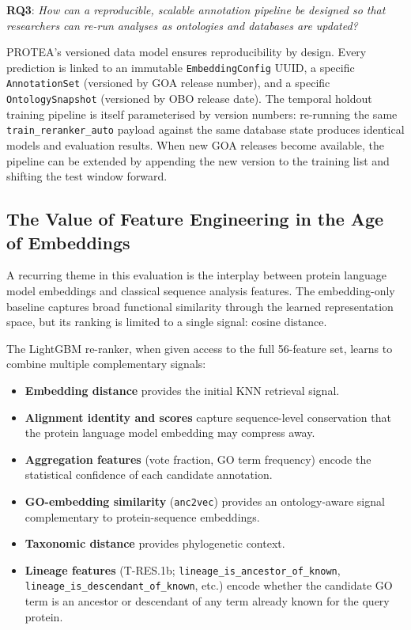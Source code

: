 \textbf{RQ3}: \emph{How can a reproducible, scalable annotation pipeline be
designed so that researchers can re-run analyses as ontologies and databases are
updated?}

PROTEA's versioned data model ensures reproducibility by design. Every
prediction is linked to an immutable \texttt{EmbeddingConfig} UUID, a specific
\texttt{AnnotationSet} (versioned by GOA release number), and a specific
\texttt{OntologySnapshot} (versioned by OBO release date). The temporal holdout
training pipeline is itself parameterised by version numbers: re-running the
same \texttt{train\_reranker\_auto} payload against the same database state
produces identical models and evaluation results. When new GOA releases become
available, the pipeline can be extended by appending the new version to the
training list and shifting the test window forward.

\subsection{The Value of Feature Engineering in the Age of Embeddings}

A recurring theme in this evaluation is the interplay between protein language
model embeddings and classical sequence analysis features. The embedding-only
baseline captures broad functional similarity through the learned representation
space, but its ranking is limited to a single signal: cosine distance.

The LightGBM re-ranker, when given access to the full 56-feature set, learns
to combine multiple complementary signals:
\begin{itemize}
  \item \textbf{Embedding distance} provides the initial KNN retrieval signal.
  \item \textbf{Alignment identity and scores} capture sequence-level conservation
    that the protein language model embedding may compress away.
  \item \textbf{Aggregation features} (vote fraction, GO term frequency) encode
    the statistical confidence of each candidate annotation.
  \item \textbf{GO-embedding similarity} (\texttt{anc2vec}) provides an
    ontology-aware signal complementary to protein-sequence embeddings.
  \item \textbf{Taxonomic distance} provides phylogenetic context.
  \item \textbf{Lineage features} (T-RES.1b; \texttt{lineage\_is\_ancestor\_of\_known},
    \texttt{lineage\_is\_descendant\_of\_known}, etc.) encode whether the candidate
    GO term is an ancestor or descendant of any term already known for the query
    protein.
\end{itemize}

